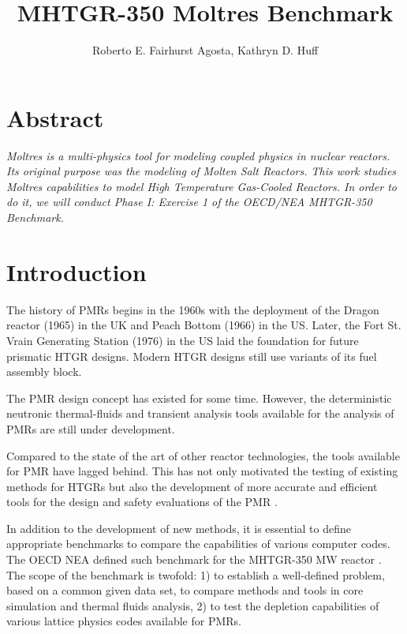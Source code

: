 \documentclass{anstrans}
\title{MHTGR-350 Moltres Benchmark}
\author{Roberto E. Fairhurst Agosta, Kathryn D. Huff}
\institute{
University of Illinois at Urbana-Champaign, Dept. of Nuclear, Plasma, and Radiological Engineering\\
ref3@illinois.edu
}
\begin{document}

\section{Abstract}

\textit{
Moltres is a multi-physics tool for modeling coupled physics in nuclear reactors.
Its original purpose was the modeling of Molten Salt Reactors.
This work studies Moltres capabilities to model High Temperature Gas-Cooled Reactors.
In order to do it, we will conduct Phase I: Exercise 1 of the OECD/NEA MHTGR-350 Benchmark.
}

\section{Introduction}

The history of \glspl{PMR} begins in the 1960s with the deployment of the Dragon reactor (1965) in the \gls{UK} and Peach Bottom (1966) in the \gls{US}.
Later, the Fort St. Vrain Generating Station (1976) in the \gls{US} laid the foundation for future prismatic \gls{HTGR} designs.
Modern \gls{HTGR} designs still use variants of its fuel assembly block.

The \gls{PMR} design concept has existed for some time.
However, the deterministic neutronic thermal-fluids and transient analysis tools available for the analysis of \glspl{PMR} are still under development.



Compared to the state of the art of other reactor technologies, the tools available for \gls{PMR} have lagged behind.
This has not only motivated the testing of existing methods for \glspl{HTGR} but also the development of more accurate and efficient tools for the design and safety evaluations of the \gls{PMR} \cite{oecd_nea_benchmark_2017}.

In addition to the development of new methods, it is essential to define appropriate benchmarks to compare the capabilities of various computer codes.
The \gls{OECD} \gls{NEA} defined such benchmark for the \gls{MHTGR}-350 MW reactor \cite{oecd_nea_benchmark_2017}.
The scope of the benchmark is twofold: 1) to establish a well-defined problem, based on a common given data set, to compare methods and tools in core simulation and thermal fluids analysis, 2) to test the depletion capabilities of various lattice physics codes available for \glspl{PMR}.
\end{document}
